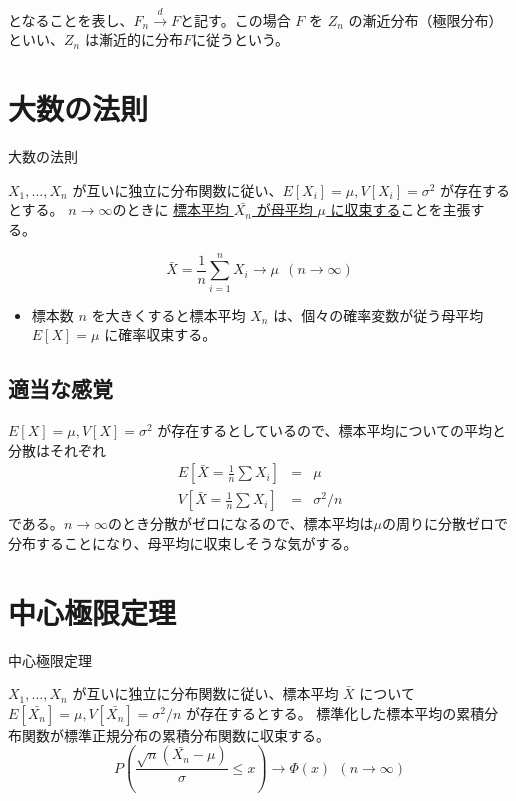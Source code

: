 \documentclass[10pt, a4paper]{ltjsarticle}
\begin{document}
となることを表し、$F_n\xrightarrow{d}F$と記す。この場合 $F$ を $Z_n$ の漸近分布（極限分布）といい、$Z_n$ は漸近的に分布$F$に従うという。


\section{大数の法則}


\begin{itembox}[l]{大数の法則}

  $X_1,...,X_n$ が互いに独立に分布関数に従い、$E[X_i]=\mu, V[X_i]=\sigma^2$ が存在するとする。
  $n\to\infty$のときに \underline{標本平均 $\bar{X_n}$ が母平均 $\mu$ に収束する}ことを主張する。

\begin{equation}
\bar{X} = \frac{1}{n} \sum_{i=1}^n X_i \to \mu ~~ (n\to\infty)
\end{equation}

\end{itembox}

\begin{itemize}
  \item 標本数 $n$ を大きくすると標本平均 $X_n$ は、個々の確率変数が従う母平均 $E[X]=\mu$ に確率収束する。
\end{itemize}


\subsection{適当な感覚}

$E[X]=\mu, V[X]=\sigma^2$ が存在するとしているので、標本平均についての平均と分散はそれぞれ
\begin{eqnarray}
E \left[\bar{X} = \frac{1}{n}\sum X_i \right] &=& \mu\\
V \left[\bar{X} = \frac{1}{n}\sum X_i\right] &=& \sigma^2/n
\end{eqnarray}
である。$n\to\infty$のとき分散がゼロになるので、標本平均は$\mu$の周りに分散ゼロで分布することになり、母平均に収束しそうな気がする。





\section{中心極限定理}


\begin{itembox}[l]{中心極限定理}

  $X_1,...,X_n$ が互いに独立に分布関数に従い、標本平均 $\bar{X}$ について $E[\bar{X_n}]=\mu, V[\bar{X_n}]=\sigma^2/n$ が存在するとする。
  標準化した標本平均の累積分布関数が標準正規分布の累積分布関数に収束する。
  \begin{equation}
    P \left(\frac{\sqrt{n}(\bar{X_n}-\mu)}{\sigma} \leq x \right) \to \Phi(x) ~~(n\to\infty)
  \end{equation}

\end{itembox}
\end{document}
